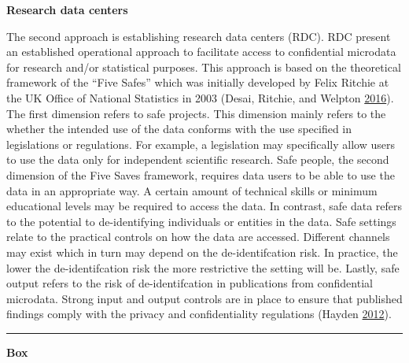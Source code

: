 \documentclass[]{krantz}
\begin{document}
\textbf{Research data centers}

The second approach is establishing research data centers (RDC). RDC
present an established operational approach to facilitate access to
confidential microdata for research and/or statistical purposes. This
approach is based on the theoretical framework of the ``Five Safes''
which was initially developed by Felix Ritchie at the UK Office of
National Statistics in 2003 (Desai, Ritchie, and Welpton
\protect\hyperlink{ref-desaietal2016}{2016}). The first dimension refers
to safe projects. This dimension mainly refers to the whether the
intended use of the data conforms with the use specified in legislations
or regulations. For example, a legislation may specifically allow users
to use the data only for independent scientific research. Safe people,
the second dimension of the Five Saves framework, requires data users to
be able to use the data in an appropriate way. A certain amount of
technical skills or minimum educational levels may be required to access
the data. In contrast, safe data refers to the potential to
de-identifying individuals or entities in the data. Safe settings relate
to the practical controls on how the data are accessed. Different
channels may exist which in turn may depend on the de-identifcation
risk. In practice, the lower the de-identifcation risk the more
restrictive the setting will be. Lastly, safe output refers to the risk
of de-identifcation in publications from confidential microdata. Strong
input and output controls are in place to ensure that published findings
comply with the privacy and confidentiality regulations (Hayden
\protect\hyperlink{ref-hayden2012broken}{2012}).

\begin{center}\rule{0.5\linewidth}{\linethickness}\end{center}

\textbf{Box}
\end{document}
